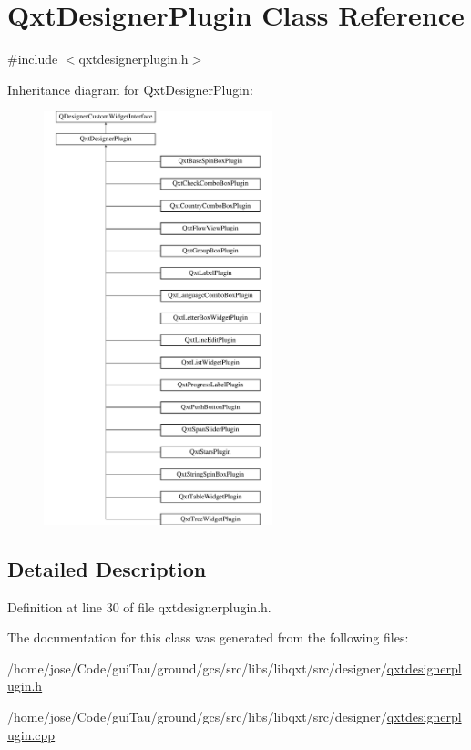\hypertarget{class_qxt_designer_plugin}{\section{Qxt\-Designer\-Plugin Class Reference}
\label{class_qxt_designer_plugin}
}


{\ttfamily \#include $<$qxtdesignerplugin.\-h$>$}

Inheritance diagram for Qxt\-Designer\-Plugin\-:\begin{figure}[H]
\begin{center}
\leavevmode
\includegraphics[height=12.000000cm]{class_qxt_designer_plugin}
\end{center}
\end{figure}


\subsection{Detailed Description}


Definition at line 30 of file qxtdesignerplugin.\-h.



The documentation for this class was generated from the following files\-:\begin{DoxyCompactItemize}
\item 
/home/jose/\-Code/gui\-Tau/ground/gcs/src/libs/libqxt/src/designer/\hyperlink{qxtdesignerplugin_8h}{qxtdesignerplugin.\-h}\item 
/home/jose/\-Code/gui\-Tau/ground/gcs/src/libs/libqxt/src/designer/\hyperlink{qxtdesignerplugin_8cpp}{qxtdesignerplugin.\-cpp}\end{DoxyCompactItemize}

